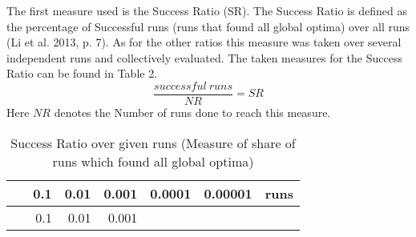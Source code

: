 \documentclass[12pt,a4paper]{article}
\begin{document}
The first measure used is the Success Ratio (SR). The Success Ratio is
defined as the percentage of Successful runs (runs that found all global
optima) over all runs (Li et al. 2013, p. 7). As for the other ratios
this measure was taken over several independent runs and collectively
evaluated. The taken measures for the Success Ratio can be found in
Table 2. \[\frac{successful\ runs}{NR} = SR \] Here \(NR\) denotes the
Number of runs done to reach this measure. \newline

\begin{longtable}[c]{@{}crrrrrr@{}}
\caption{Success Ratio over given runs (Measure of share of runs which
found all global optima)}\tabularnewline
\toprule
\begin{minipage}[b]{0.11\columnwidth}\centering\strut
~
\strut\end{minipage} &
\begin{minipage}[b]{0.07\columnwidth}\raggedleft\strut
0.1
\strut\end{minipage} &
\begin{minipage}[b]{0.08\columnwidth}\raggedleft\strut
0.01
\strut\end{minipage} &
\begin{minipage}[b]{0.09\columnwidth}\raggedleft\strut
0.001
\strut\end{minipage} &
\begin{minipage}[b]{0.10\columnwidth}\raggedleft\strut
0.0001
\strut\end{minipage} &
\begin{minipage}[b]{0.11\columnwidth}\raggedleft\strut
0.00001
\strut\end{minipage} &
\begin{minipage}[b]{0.07\columnwidth}\raggedleft\strut
runs
\strut\end{minipage}\tabularnewline
\midrule
\endfirsthead
\toprule
\begin{minipage}[b]{0.11\columnwidth}\centering\strut
~
\strut\end{minipage} &
\begin{minipage}[b]{0.07\columnwidth}\raggedleft\strut
0.1
\strut\end{minipage} &
\begin{minipage}[b]{0.08\columnwidth}\raggedleft\strut
0.01
\strut\end{minipage} &
\begin{minipage}[b]{0.09\columnwidth}\raggedleft\strut
0.001
\strut\end{minipage} &
\begin{minipage}[b]{0.10\columnwidth}\raggedleft\strut

\end{minipage}
\end{longtable}
\end{document}
